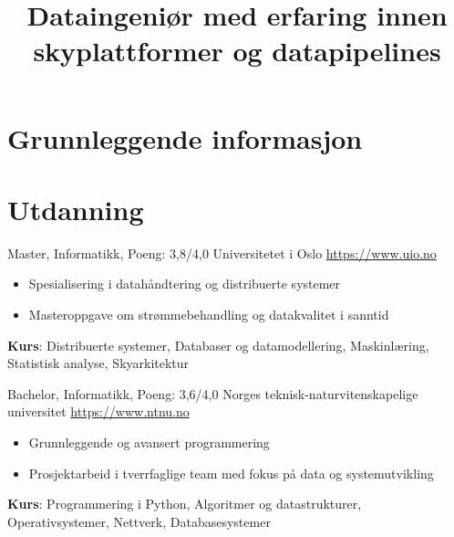 \documentclass[a4paper, serif, 10pt]{moderncv}
\title{Dataingeniør med erfaring innen skyplattformer og datapipelines}
\begin{document}
\maketitle

\section{Grunnleggende informasjon}

\section{Utdanning}

        {Master, Informatikk, Poeng: 3,8/4,0}
        {Universitetet i Oslo}
        {\url{https://www.uio.no}}
        {}
        {\begin{itemize}
\item Spesialisering i datahåndtering og distribuerte systemer
\item Masteroppgave om strømmebehandling og datakvalitet i sanntid
\end{itemize}
\textbf{Kurs}: Distribuerte systemer, Databaser og datamodellering, Maskinlæring, Statistisk analyse, Skyarkitektur}

        {Bachelor, Informatikk, Poeng: 3,6/4,0}
        {Norges teknisk-naturvitenskapelige universitet}
        {\url{https://www.ntnu.no}}
        {}
        {\begin{itemize}
\item Grunnleggende og avansert programmering
\item Prosjektarbeid i tverrfaglige team med fokus på data og systemutvikling
\end{itemize}
\textbf{Kurs}: Programmering i Python, Algoritmer og datastrukturer, Operativsystemer, Nettverk, Databasesystemer}
\end{document}
